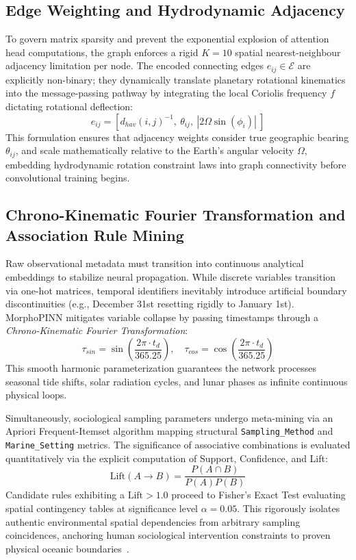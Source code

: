 \documentclass[conference]{IEEEtran}
\begin{document}
\subsection{Edge Weighting and Hydrodynamic Adjacency}
To govern matrix sparsity and prevent the exponential explosion of attention head computations, the graph enforces a rigid $K=10$ spatial nearest-neighbour adjacency limitation per node. The encoded connecting edges $e_{ij} \in \mathcal{E}$ are explicitly non-binary; they dynamically translate planetary rotational kinematics into the message-passing pathway by integrating the local Coriolis frequency $f$ dictating rotational deflection:
\begin{equation}
    e_{ij} = \left[ d_{hav}(i,j)^{-1}, \ \theta_{ij}, \ |2\Omega\sin(\phi_i)| \ \right]
\end{equation}
This formulation ensures that adjacency weights consider true geographic bearing $\theta_{ij}$, and scale mathematically relative to the Earth's angular velocity $\Omega$, embedding hydrodynamic rotation constraint laws into graph connectivity before convolutional training begins.

\subsection{Chrono-Kinematic Fourier Transformation and Association Rule Mining}
Raw observational metadata must transition into continuous analytical embeddings to stabilize neural propagation. While discrete variables transition via one-hot matrices, temporal identifiers inevitably introduce artificial boundary discontinuities (e.g., December 31st resetting rigidly to January 1st). MorphoPINN mitigates variable collapse by passing timestamps through a \textit{Chrono-Kinematic Fourier Transformation}:
\begin{equation}
    \tau_{sin} = \sin\left(\frac{2\pi \cdot t_d}{365.25}\right), \quad \tau_{cos} = \cos\left(\frac{2\pi \cdot t_d}{365.25}\right)
\end{equation}
This smooth harmonic parameterization guarantees the network processes seasonal tide shifts, solar radiation cycles, and lunar phases as infinite continuous physical loops.

Simultaneously, sociological sampling parameters undergo meta-mining via an Apriori Frequent-Itemset algorithm mapping structural \texttt{Sampling\_Method} and \texttt{Marine\_Setting} metrics. The significance of associative combinations is evaluated quantitatively via the explicit computation of Support, Confidence, and Lift:
\begin{equation}
    \text{Lift}(A \rightarrow B) = \frac{P(A \cap B)}{P(A)P(B)}
\end{equation}
Candidate rules exhibiting a $\text{Lift} > 1.0$ proceed to Fisher's Exact Test evaluating spatial contingency tables at significance level $\alpha = 0.05$. This rigorously isolates authentic environmental spatial dependencies from arbitrary sampling coincidences, anchoring human sociological intervention constraints to proven physical oceanic boundaries~\cite{ref32}.
\end{document}
